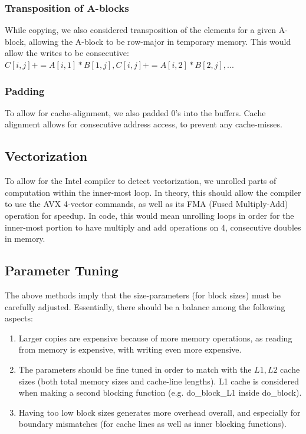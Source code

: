 \documentclass[12pt]{article}
\begin{document}
\subsubsection{Transposition of A-blocks}
While copying, we also considered transposition of the elements for a given A-block, allowing the A-block to be row-major in temporary memory. This would allow the writes to be consecutive: $C[i,j] += A[i, 1]*B[1, j], C[i,j] += A[i,2]* B[2, j],...$ 
\subsubsection{Padding}
To allow for cache-alignment, we also padded 0's into the buffers. Cache alignment allows for consecutive address access, to prevent any cache-misses. 

\subsection{Vectorization} 
To allow for the Intel compiler to detect vectorization,  we unrolled parts of computation within the inner-most loop. In theory, this should allow the compiler to use the AVX 4-vector commands, as well as its FMA (Fused Multiply-Add) operation for speedup. In code, this would mean unrolling loops in order for the inner-most portion to have multiply and add operations on 4, consecutive doubles in memory.

\subsection{Parameter Tuning}
The above methods imply that the size-parameters (for block sizes) must be carefully adjusted. Essentially, there should be a balance among the following aspects: 
\begin{enumerate}
\item Larger copies are expensive because of more memory operations, as reading from memory is expensive, with writing even more expensive.
\item The parameters should be fine tuned in order to match with the $L1, L2$ cache sizes (both total memory sizes and cache-line lengths). L1 cache is considered when making a second blocking function (e.g. do\_block\_L1 inside do\_block). 
\item Having too low block sizes generates more overhead overall, and especially for boundary mismatches (for cache lines as well as inner blocking functions).  
\end{enumerate}
\end{document}

